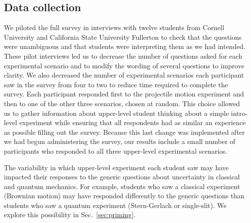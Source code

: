 \documentclass[english,aps,prstper,reprint,showpacs,longbibliography,superscriptaddress,nofootinbib]{revtex4-2}
\begin{document}
\subsection{Data collection}

We piloted the full survey in interviews with twelve students from Cornell University and California State University Fullerton to check that the questions were unambiguous and that students were interpreting them as we had intended. These pilot interviews led us to decrease the number of questions asked for each experimental scenario and to modify the wording of several questions to improve clarity. We also decreased the number of experimental scenarios each participant saw in the survey from four to two to reduce time required to complete the survey. Each participant responded first to the projectile motion experiment and then to one of the other three scenarios, chosen at random. This choice allowed us to gather information about upper-level student thinking about a simple intro-level experiment while ensuring that all respondents had as similar an experience as possible filling out the survey. Because this last change was implemented after we had begun administering the survey, our results include a small number of participants who responded to all three upper-level experimental scenarios.


The variability in which upper-level experiment each student saw may have impacted their responses to the generic questions about uncertainty in classical and quantum mechanics. For example, students who saw a classical experiment (Brownian motion) may have responded differently to the generic questions than students who saw a quantum experiment (Stern-Gerlach or single-slit). We explore this possibility in Sec.~\ref{sec:priming}. 
\end{document}
